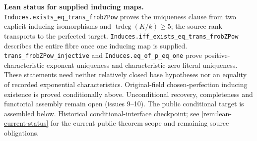 \documentclass[11pt,oneside]{article}
\theoremstyle{definition}
\theoremstyle{remark}
\newcommand{\trdeg}{\operatorname{trdeg}}
\newcommand{\lean}[1]{\nolinkurl{#1}}
\begin{document}
\noindent\textbf{Lean status for supplied inducing maps.}
\lean{Induces.exists_eq_trans_frobZPow} proves the uniqueness clause from two explicit
inducing isomorphisms and $\trdeg(K/k)\geq5$; the source rank transports to the
perfected target. \lean{Induces.iff_exists_eq_trans_frobZPow} describes the entire fibre
once one inducing map is supplied. \lean{trans_frobZPow_injective} and
\lean{Induces.eq_of_p_eq_one} prove positive-characteristic exponent uniqueness
and characteristic-zero literal uniqueness. These statements need neither relatively
closed base hypotheses nor an equality of recorded exponential characteristics.
Original-field chosen-perfection inducing existence is proved conditionally above.
Unconditional recovery, completeness and functorial assembly remain open
(issues 9--10). The public conditional target is assembled below.
Historical conditional-interface checkpoint; see \cref{rem:lean-current-status} for
the current public theorem scope and remaining source obligations.
\end{document}

